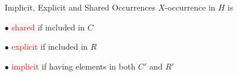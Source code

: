 \documentclass{beamer}
\begin{document}
\begin{frame}{Implicit, Explicit and Shared Occurrences}
    $X$-occurrence in $H$ is 

   \parbox{0.45\textwidth}{\hspace{3mm}$\bullet$ \textcolor{red}{shared} if 
    included in $C$ 
   }
   \parbox{0.45\textwidth}{\hspace{3mm}$\bullet$ \textcolor{red}{explicit} if 
    included in $R$
   }

    \parbox{\textwidth}{\hspace{3mm}$\bullet$ \textcolor{red}{implicit} if 
    having elements in both $C'$ and $R'$
    }
\end{frame}
 
\end{document}
